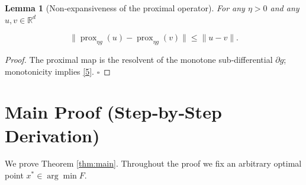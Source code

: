 \documentclass{article}
\newtheorem{lemma}{Lemma}
\newcommand{\prox}{\operatorname{prox}}
\newcommand{\R}{\mathbb{R}}
\begin{document}
\begin{lemma}[Non‑expansiveness of the proximal operator]\label{lem:nonexp}
For any $\eta>0$ and any $u,v\in\R^{d}$  

\[
\big\|\prox_{\eta g}(u)-\prox_{\eta g}(v)\big\|\le\|u-v\|.
\tag{5}
\]
\end{lemma}
\begin{proof}
The proximal map is the resolvent of the monotone sub‑differential $\partial g$; monotonicity implies \eqref{5}. \hfill $\square$
\end{proof}

\section*{Main Proof (Step‑by‑Step Derivation)}
We prove Theorem \ref{thm:main}. Throughout the proof we fix an arbitrary optimal point $x^{*}\in\arg\min F$.
\end{document}
